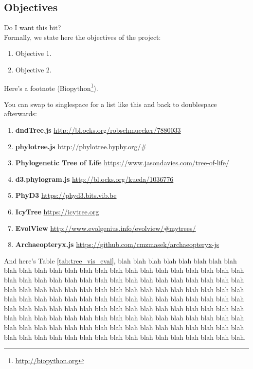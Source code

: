 \documentclass[12pt,a4paper]{article}
\begin{document}
\subsection{Objectives}
\label{sec:objectives}
Do I want this bit?\\
Formally, we state here the objectives of the project:
\begin{enumerate}
\item Objective 1.
\item Objective 2.
\end{enumerate}

Here's a footnote (Biopython\footnote{\url{http://biopython.org}}).

You can swap to singlespace for a list like this and back to doublespace afterwards:

\singlespace
\begin{enumerate}
\item {\bf dndTree.js} \small \url{http://bl.ocks.org/robschmuecker/7880033} \normalsize
\item {\bf phylotree.js} \small \url{http://phylotree.hyphy.org/#} \normalsize
\item {\bf Phylogenetic Tree of Life} \small \url{https://www.jasondavies.com/tree-of-life/} \normalsize
\item {\bf d3.phylogram.js} \small \url{http://bl.ocks.org/kueda/1036776} \normalsize
\item {\bf PhyD3} \small \url{https://phyd3.bits.vib.be} \normalsize
\item {\bf IcyTree} \small \url{https://icytree.org} \normalsize
\item {\bf EvolView} \small \url{http://www.evolgenius.info/evolview/#mytrees/} \normalsize
\item {\bf Archaeopteryx.js} \small \url{https://github.com/cmzmasek/archaeopteryx-js} \normalsize
\end{enumerate}
\doublespace

And here's Table \ref{tab:tree_vis_eval}, blah blah blah blah blah blah blah blah blah blah blah blah blah blah blah blah blah blah blah blah blah blah blah blah blah blah blah blah blah blah blah blah blah blah blah blah blah blah blah blah blah blah blah blah blah blah blah blah blah blah blah blah blah blah blah blah blah blah blah blah blah blah blah blah blah blah blah blah blah blah blah blah blah blah blah blah blah blah blah blah blah blah blah blah blah blah blah blah blah blah blah blah blah blah blah blah blah blah blah blah blah blah blah blah blah blah blah blah blah blah blah blah blah blah blah blah blah blah blah blah blah blah blah blah blah blah blah blah blah blah blah blah blah blah blah blah.\\
\end{document}
